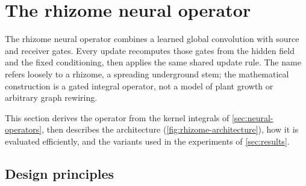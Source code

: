 \section{The rhizome neural operator}
\label{sec:rhizome}

The rhizome neural operator combines a learned global convolution with source and receiver gates. Every update recomputes those gates from the hidden field and the fixed conditioning, then applies the same shared update rule. The name refers loosely to a rhizome, a spreading underground stem; the mathematical construction is a gated integral operator, not a model of plant growth or arbitrary graph rewiring.

This section derives the operator from the kernel integrals of \cref{sec:neural-operators}, then describes the architecture (\cref{fig:rhizome-architecture}), how it is evaluated efficiently, and the variants used in the experiments of \cref{sec:results}.

\subsection{Design principles}
\label{sec:rhizome-principles}

